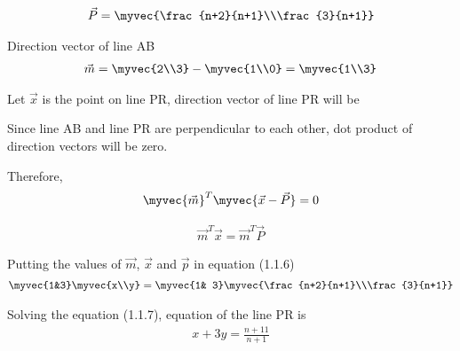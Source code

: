 \documentclass[journal,12pt,twocolumn]{IEEEtran}
\begin{document}
\begin{align}
\vec{P} = \myvec{\frac{n+2}{n+1}\\\frac{3}{n+1}}
\end{align}

Direction vector of line AB
\begin{align}
 \vec{m}=\myvec{2\\3}-\myvec{1\\0} = \myvec{1\\3} 
\end{align}

Let $\vec{x}$ is the point on line PR, direction vector of line PR will be 

Since line AB and line PR are perpendicular to each other, dot product of direction vectors will be zero.

Therefore, 
\begin{align}
\myvec{\vec{m}}^T\myvec{\vec{x}-\vec{P}}=0
\end{align}




\begin{align}
\vec{m}^T\vec{x}=\vec{m}^T\vec{P}
\end{align}



Putting the values of $\vec{m}$, $\vec{x}$ and $\vec{p} $ in equation (1.1.6)
\begin{align}
\myvec{1&3}\myvec{x\\y}=\myvec{1& 3}\myvec{\frac{n+2}{n+1}\\\frac{3}{n+1}}
\end{align}

Solving the equation (1.1.7), 
equation of the line PR is
\begin{align}
x+3y =\frac{n+11}{n+1}
\end{align}
\end{document}
